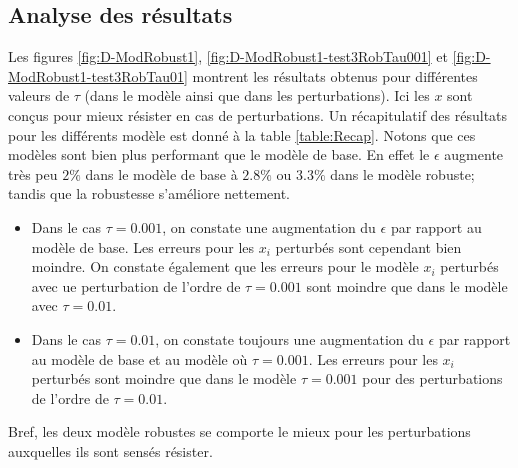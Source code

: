 \subsection{Analyse des résultats}
Les figures \ref{fig:D-ModRobust1}, \ref{fig:D-ModRobust1-test3RobTau001} et \ref{fig:D-ModRobust1-test3RobTau01} montrent les résultats obtenus pour différentes valeurs de $\tau$ (dans le modèle ainsi que dans les perturbations). Ici les $x$ sont conçus pour mieux résister en cas de perturbations. Un récapitulatif des résultats pour les différents modèle est donné à la table \ref{table:Recap}. Notons que ces modèles sont bien plus performant que le modèle de base. En effet le $\epsilon$ augmente très peu $2\%$ dans le modèle de base à $2.8\%$ ou $3.3\%$ dans le modèle robuste; tandis que la robustesse s'améliore nettement.\\
\begin{itemize}
\item Dans le cas $\tau = 0.001$, on constate une augmentation du $\epsilon$ par rapport au modèle de base. Les erreurs pour les $x_i$ perturbés sont cependant bien moindre. On constate également que les erreurs pour le modèle $x_i$ perturbés avec ue perturbation de l'ordre de $\tau=0.001$ sont moindre que dans le modèle avec $\tau=0.01$.\\ 
 \item Dans le cas $\tau = 0.01$, on constate toujours une augmentation du $\epsilon$ par rapport au modèle de base et au modèle où $\tau = 0.001$. Les erreurs pour les $x_i$ perturbés sont moindre que dans le modèle $\tau=0.001$ pour des perturbations de l'ordre de $\tau = 0.01$.
\end{itemize}
Bref, les deux modèle robustes se comporte le mieux pour les perturbations auxquelles ils sont sensés résister.

